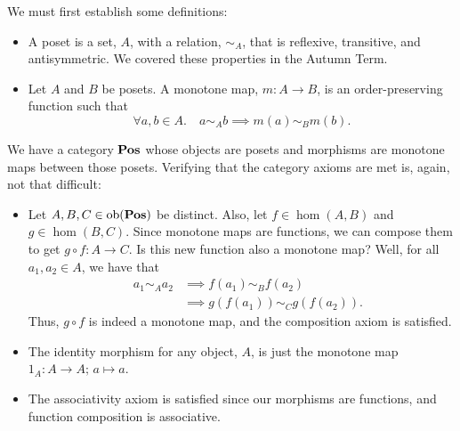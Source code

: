 \documentclass[10pt,a4paper,reqno]{amsart}
\numberwithin{figure}{section}
\begin{document}
We must first establish some definitions:
\begin{itemize}
        \item A poset is a set, $A$, with a relation, $\sim_A$, that is
                reflexive, transitive, and antisymmetric. We covered these properties in
                the Autumn Term.
        \item Let $A$ and $B$ be posets. A monotone map, $m \colon A \to B$, is an
                order-preserving function such that
                \[
                        \forall a, b \in A. \quad a \sim_A b
                        \implies m(a) \sim_B m(b).
                \]
\end{itemize}
We have a category $\operatorname{\mathbf{Pos}}$ whose objects are posets and morphisms are monotone
maps between those posets. Verifying that the category axioms are met is, again, not
that difficult:
\begin{itemize}
        \item Let $A, B, C \in \operatorname{ob} ( \operatorname{\mathbf{Pos}} )$ be distinct. Also, let
                $f \in \hom (A, B)$ and $g \in \hom (B, C)$. Since monotone maps
                are functions, we can compose them to get  $g \circ f \colon A
                \to C$. Is this new function also a monotone map? Well, for
                all $a_1, a_2 \in A$, we have that
                \begin{align*}
                        \quad a_1 \sim_A a_2 &\implies f(a_1) \sim_B f(a_2) \\
                        &\implies g(f(a_1)) \sim_C g(f(a_2)).
                \end{align*}
                Thus, $g \circ f$ is indeed a monotone map, and the composition
                axiom is satisfied.
        \item The identity morphism for any object, $A$, is just the monotone
                map \\ $1_A \colon A \to A ; \, a \mapsto a$.
        \item The associativity axiom is satisfied since our morphisms are
                functions, and function composition is associative.
\end{itemize}
\end{document}
